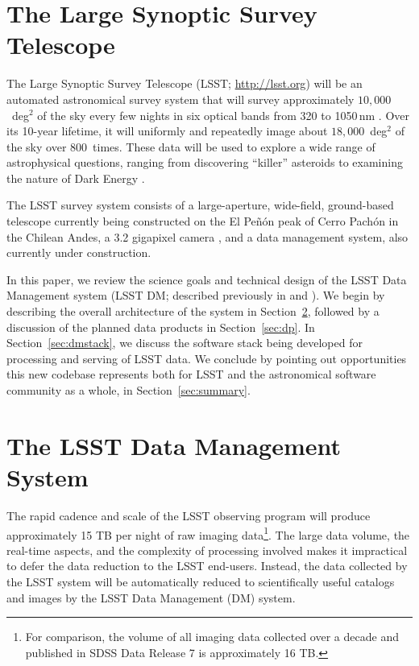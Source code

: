 \documentclass[11pt,twoside]{article}
\begin{document}
\section{ The Large Synoptic Survey Telescope }

The Large Synoptic Survey Telescope (LSST; \url{http://lsst.org}) will be an
automated astronomical survey system that will survey approximately
$10,000$~deg$^2$ of the sky every few nights in six optical bands from 320
to 1050\,nm \citep{2008arXiv0805.2366I}. Over its 10-year lifetime, it will
uniformly and repeatedly image about $18,000$~deg$^2$ of the sky
over $800$~times. These data will be used to explore
a wide range of astrophysical questions, ranging from discovering
``killer'' asteroids to examining the nature of Dark Energy
\citep[e.g., see][]{2009arXiv0912.0201L}.

The LSST survey system consists of a large-aperture, wide-field, ground-based telescope \citep{2014SPIE.9145E..1AG}
currently being constructed on the El Pe\~n\'{o}n peak of Cerro Pach\'{o}n in the Chilean
Andes, a 3.2 gigapixel camera \citep{2010SPIE.7735E..0JK}, and a data management
system, also currently under construction.

In this paper, we review the science goals and technical design of the
LSST Data Management system
(LSST DM; described previously in \citet{2007ASPC..376....3K} and \citet{2010SPIE.7740E..1NK}).
We begin by describing the overall architecture of the system in
Section~\ref{sec:dm}, followed by a discussion of the planned data
products in Section~\ref{sec:dp}. In Section~\ref{sec:dmstack}, we
discuss the software stack being developed for processing and serving
of LSST data. We  conclude by pointing out opportunities this new codebase
represents both for LSST and the astronomical software community as
a whole, in Section~\ref{sec:summary}.

\section{ The LSST Data Management System }
\label{sec:dm}

The rapid cadence and scale of the LSST observing program will produce
approximately 15 TB per night of raw imaging data\footnote{For
  comparison, the volume of all imaging data collected over a decade
  and published in SDSS Data Release 7 \citep{2009ApJS..182..543A} is approximately 16 TB.}. The large data volume, the real-time aspects, and the complexity of processing involved makes it impractical to defer the data reduction to the LSST end-users. Instead, the data collected by the LSST system will be automatically reduced to scientifically useful catalogs and images by the LSST Data Management (DM) system.
\\
\end{document}
